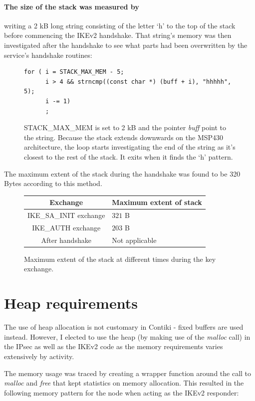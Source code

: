 \documentclass[final,a4paper,twoside,11pt,onecolumn]{report}
\begin{document}
\paragraph{The size of the stack was measured by} writing a 2 kB long string consisting of the letter `h' to the top of the stack before commencing the IKEv2 handshake. That string's memory was then investigated after the handshake to see what parts had been overwritten by the service's handshake routines:

\begin{figure}[h]
\centering
\begin{verbatim}
for ( i = STACK_MAX_MEM - 5;
      i > 4 && strncmp((const char *) (buff + i), "hhhhh", 5);
      i -= 1)
      ;
\end{verbatim}
\label{code:stack}
\caption{STACK\_MAX\_MEM is set to 2 kB and the pointer \emph{buff} point to the string. Because the stack extends downwards on the MSP430 architecture, the loop starts investigating the end of the string as it's closest to the rest of the stack. It exits when it finds the `h' pattern.}
\end{figure}

The maximum extent of the stack during the handshake was found to be 320 Bytes according to this method.

\begin{figure}[h]
\centering
\label{tab:eval-stack}
\begin{tabular}{c|l}
Exchange                      & Maximum extent of stack  \\ \hline
IKE\_SA\_INIT exchange      & $321$ B                    \\
IKE\_AUTH exchange          & $203$ B                    \\
After handshake            & Not applicable
\end{tabular}
\caption{Maximum extent of the stack at different times during the key exchange.}
\end{figure}

\section{Heap requirements}
The use of heap allocation is not customary in Contiki - fixed buffers are used instead. However, I elected to use the heap (by making use of the \emph{malloc} call) in the IPsec as well as the IKEv2 code as the memory requirements varies extensively by activity.

The memory usage was traced by creating a wrapper function around the call to \emph{malloc} and \emph{free} that kept statistics on memory allocation. This resulted in the following memory pattern for the node when acting as the IKEv2 responder:
\end{document}
